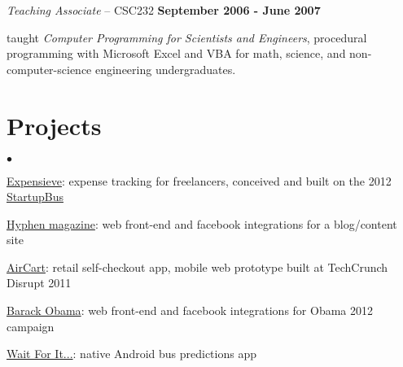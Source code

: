 \documentclass[margin,line]{res}
\newenvironment{list1}{
  \begin{list}{\ding{113}}{%
      \setlength{\itemsep}{0in}
      \setlength{\parsep}{0in} \setlength{\parskip}{0in}
      \setlength{\topsep}{0in} \setlength{\partopsep}{0in} 
      \setlength{\leftmargin}{0.17in}}}{\end{list}}
\newenvironment{list2}{
  \begin{list}{$\bullet$}{%
      \setlength{\itemsep}{0in}
      \setlength{\parsep}{0in} \setlength{\parskip}{0in}
      \setlength{\topsep}{0in} \setlength{\partopsep}{0in} 
      \setlength{\leftmargin}{0.2in}}}{\end{list}}
\begin{document}
\begin{resume}
\vspace{-0.8cm}
{\em Teaching Associate} -- CSC232 \hfill {\small \bf September 2006 - June 2007}
\begin{list1}
\item[] taught {\em Computer Programming for Scientists and Engineers}, procedural programming with Microsoft Excel and VBA for math, science, and non-computer-science engineering undergraduates.
\end{list1}

\section{\sc \large Projects} 
\begin{list2}
\item \href{http://www.expensieve.com}{Expensieve}: expense tracking for freelancers, conceived and built on the 2012 \href{http://startupbus.com/americas/}{StartupBus}
\item \href{http://www.hyphenmagazine.com}{Hyphen magazine}: web front-end and facebook integrations for a blog/content site
\item \href{http://aircartapp.com/}{AirCart}: retail self-checkout app, mobile web prototype built at TechCrunch Disrupt 2011
\item \href{http://www.barackobama.com/}{Barack Obama}: web front-end and facebook integrations for Obama 2012 campaign
\item \href{https://play.google.com/store/apps/details?id=com.bryanestrada.waitforit}{Wait For It...}: native Android bus predictions app\\
\end{list2}



\end{resume}
\end{document}
